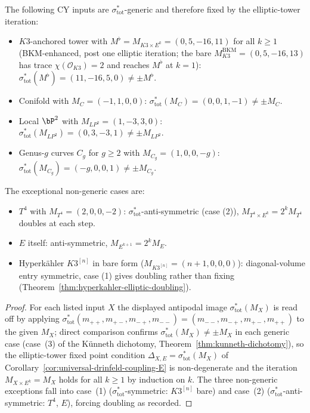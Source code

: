 \begin{corollary}
\label{cor:sigma-generic-fixed-points}
The following CY inputs are $\sigma_{\mathrm{tot}}^*$-generic and therefore
fixed by the elliptic-tower iteration:
\begin{itemize}
 \item $K3$-anchored tower with $M^\flat = M_{K3 \times E^k} = (0, 5, -16, 11)$
 for all $k \geq 1$ \textup{(}BKM-enhanced, post one elliptic iteration;
 the bare $M_{K3}^{\mathrm{BKM}} = (0, 5, -16, 13)$ has trace
 $\chi(\mathcal{O}_{K3}) = 2$ and reaches $M^\flat$ at $k = 1$\textup{):}
 $\sigma_{\mathrm{tot}}^*(M^\flat) = (11, -16, 5, 0) \neq \pm M^\flat$.
 \item Conifold with $M_C = (-1, 1, 0, 0)$:
 $\sigma_{\mathrm{tot}}^*(M_C) = (0, 0, 1, -1) \neq \pm M_C$.
 \item Local $\bP^2$ with $M_{LP^2} = (1, -3, 3, 0)$:
 $\sigma_{\mathrm{tot}}^*(M_{LP^2}) = (0, 3, -3, 1) \neq \pm M_{LP^2}$.
 \item Genus-$g$ curves $C_g$ for $g \geq 2$ with $M_{C_g} = (1, 0, 0, -g)$:
 $\sigma_{\mathrm{tot}}^*(M_{C_g}) = (-g, 0, 0, 1) \neq \pm M_{C_g}$.
\end{itemize}
The exceptional non-generic cases are:
\begin{itemize}
 \item $T^4$ with $M_{T^4} = (2, 0, 0, -2)$: $\sigma_{\mathrm{tot}}^*$-anti-symmetric
 \textup{(}case (2)\textup{), }$M_{T^4 \times E^k} = 2^k M_{T^4}$ doubles at each step.
 \item $E$ itself: anti-symmetric, $M_{E^{k+1}} = 2^k M_E$.
 \item Hyperk\"ahler $K3^{[n]}$ in bare form
 \textup{(}$M_{K3^{[n]}} = (n+1, 0, 0, 0)$\textup{):}
 diagonal-volume entry symmetric, case (1) gives doubling rather than
 fixing \textup{(}Theorem~\ref{thm:hyperkahler-elliptic-doubling}\textup{).}
\end{itemize}
\end{corollary}

\begin{proof}
For each listed input $X$ the displayed antipodal image
$\sigma_{\mathrm{tot}}^*(M_X)$ is read off by applying
$\sigma_{\mathrm{tot}}^*(m_{++}, m_{+-}, m_{-+}, m_{--}) =
(m_{--}, m_{-+}, m_{+-}, m_{++})$ to the given $M_X$; direct comparison
confirms $\sigma_{\mathrm{tot}}^*(M_X) \neq \pm M_X$ in each generic
case (case~(3) of the Künneth dichotomy,
Theorem~\ref{thm:kunneth-dichotomy}), so the elliptic-tower fixed point
condition $\Delta_{X, E} = \sigma_{\mathrm{tot}}^*(M_X)$ of
Corollary~\ref{cor:universal-drinfeld-coupling-E} is non-degenerate and
the iteration $M_{X \times E^k} = M_X$ holds for all $k \geq 1$ by
induction on $k$. The three non-generic exceptions fall into case~(1)
\textup{(}$\sigma_{\mathrm{tot}}^*$-symmetric: $K3^{[n]}$ bare\textup{)}
and case~(2) \textup{(}$\sigma_{\mathrm{tot}}^*$-anti-symmetric: $T^4$,
$E$\textup{),} forcing doubling as recorded.
\end{proof}

